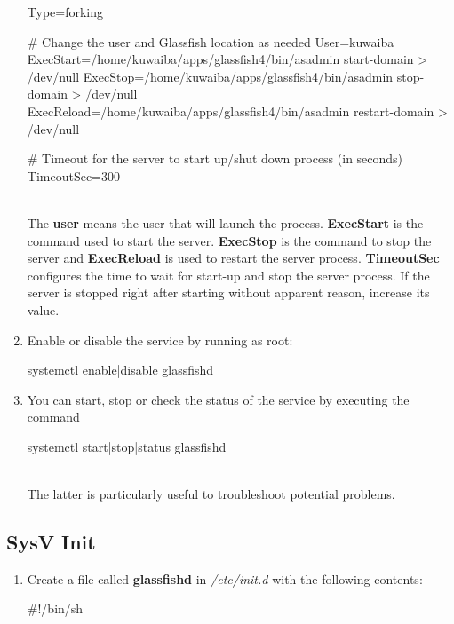 \documentclass[a4paper]{article}
\begin{document}
\begin{appendices}
\begin{enumerate}
\begin{verbbox}
						[Service]
						Type=forking
						
						# Change the user and Glassfish location as needed
						User=kuwaiba
						ExecStart=/home/kuwaiba/apps/glassfish4/bin/asadmin start-domain > /dev/null
						ExecStop=/home/kuwaiba/apps/glassfish4/bin/asadmin stop-domain > /dev/null
						ExecReload=/home/kuwaiba/apps/glassfish4/bin/asadmin restart-domain > /dev/null
						
						# Timeout for the server to start up/shut down process (in seconds)
						TimeoutSec=300
					\end{verbbox}
					\begin{figure}[ht]
						\centering	
						\theverbbox
					\end{figure}\\
					The \textbf{user} means the user that will launch the process. \textbf{ExecStart} is the command used to start the server. \textbf{ExecStop} is the command to stop the server and \textbf{ExecReload} is used to restart the server process. \textbf{TimeoutSec} configures the time to wait for start-up and stop the server process. If the server is stopped right after starting without apparent reason, increase its value.
					\item Enable or disable the service by running as root: 
					\begin{verbbox}
						systemctl enable|disable glassfishd
					\end{verbbox}
					\begin{figure}[ht]
						\centering	
						\theverbbox
					\end{figure}
					\item You can start, stop or check the status of the service by executing the command
					\begin{verbbox}
						systemctl start|stop|status glassfishd
					\end{verbbox}
					\begin{figure}[ht]
						\centering	
						\theverbbox
					\end{figure}\\
					The latter is particularly useful to troubleshoot potential problems.
				\end{enumerate}
				
				\newpage
				\subsection{SysV Init}
				\begin{enumerate}
					\item Create a file called \textbf{glassfishd} in \textit{/etc/init.d} with the following contents:
					\begin{verbbox}
						#!/bin/sh
						

\end{verbbox}
\end{enumerate}
\end{appendices}
\end{document}
